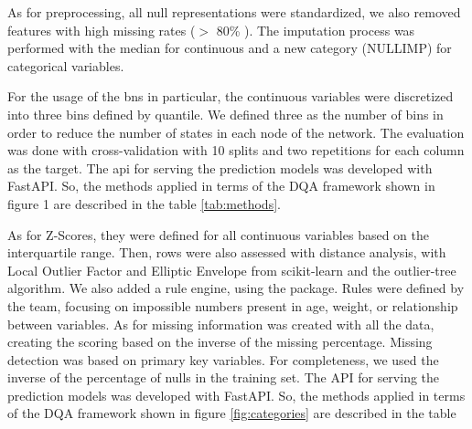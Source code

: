 As for preprocessing, all null representations were standardized, we also removed features with high missing rates ($>$ 80\% ).  The imputation process was performed with the median for continuous and a new category (NULLIMP) for categorical variables. 

For the usage of the \acp{bn} in particular, the continuous variables were discretized into three bins defined by quantile. We defined three as the number of bins in order to reduce the number of states in each node of the network. The evaluation was done with cross-validation with 10 splits and two repetitions for each column as the target.
The \ac{api} for serving the prediction models was developed with FastAPI. So, the methods applied in terms of the DQA framework shown in figure 1 are described in the table \ref{tab:methods}.


As for  Z-Scores, they were defined for all continuous variables based on the interquartile range. Then, rows were also assessed with distance analysis, with Local Outlier Factor and Elliptic Envelope from scikit-learn and the outlier-tree algorithm. We also added a rule engine, using the  package. Rules were defined by the team, focusing on impossible numbers present in age, weight, or relationship between variables. As for missing information was created with all the data, creating the scoring based on the inverse of the missing percentage. Missing detection was based on primary key variables. For completeness, we used the inverse of the percentage of nulls in the training set.
The API for serving the prediction models was developed with FastAPI. So, the methods applied in terms of the DQA framework shown in figure \ref{fig:categories} are described in the table 

